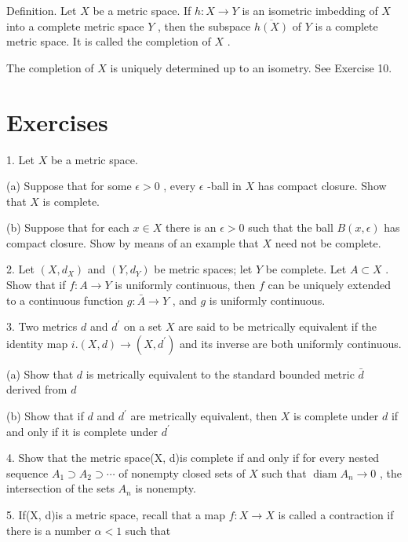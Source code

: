 Definition. Let \(X\) be a metric space. If \(h : X \rightarrow  Y\) is an isometric imbedding of \(X\) into a complete metric space \(Y\) , then the subspace \(\overline{h\left( X\right) }\) of \(Y\) is a complete metric space. It is called the completion of \(X\) .

The completion of \(X\) is uniquely determined up to an isometry. See Exercise 10.

\section*{Exercises}

1. Let \(X\) be a metric space.

(a) Suppose that for some \(\epsilon  > 0\) , every \(\epsilon\) -ball in \(X\) has compact closure. Show that \(X\) is complete.

(b) Suppose that for each \(x \in  X\) there is an \(\epsilon  > 0\) such that the ball \(B\left( {x,\epsilon }\right)\) has compact closure. Show by means of an example that \(X\) need not be complete.

2. Let \(\left( {X,{d}_{X}}\right)\) and \(\left( {Y,{d}_{Y}}\right)\) be metric spaces; let \(Y\) be complete. Let \(A \subset  X\) . Show that if \(f : A \rightarrow  Y\) is uniformly continuous, then \(f\) can be uniquely extended to a continuous function \(g : \bar{A} \rightarrow  Y\) , and \(g\) is uniformly continuous.

3. Two metrics \(d\) and \({d}^{\prime }\) on a set \(X\) are said to be metrically equivalent if the identity map \(i.\left( {X,d}\right)  \rightarrow  \left( {X,{d}^{\prime }}\right)\) and its inverse are both uniformly continuous.

(a) Show that \(d\) is metrically equivalent to the standard bounded metric \(\bar{d}\) derived from \(d\)

(b) Show that if \(d\) and \({d}^{\prime }\) are metrically equivalent, then \(X\) is complete under \(d\) if and only if it is complete under \({d}^{\prime }\)

4. Show that the metric space(X, d)is complete if and only if for every nested sequence \({A}_{1} \supset  {A}_{2} \supset  \cdots\) of nonempty closed sets of \(X\) such that \(\operatorname{diam}{A}_{n} \rightarrow  0\) , the intersection of the sets \({A}_{n}\) is nonempty.

5. If(X, d)is a metric space, recall that a map \(f : X \rightarrow  X\) is called a contraction if there is a number \(\alpha  < 1\) such that

